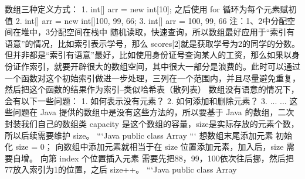 \markdownRendererInterblockSeparator
{}\markdownRendererInterblockSeparator
{}数组三种定义方式： 1. int[] arr = new int[10]; 之后使用 for 循环为每个元素赋初值 2. int[] arr = new int[]\markdownRendererLeftBrace{}100, 99, 66\markdownRendererRightBrace{}; 3. int[] arr = \markdownRendererLeftBrace{}100, 99, 66\markdownRendererRightBrace{} 注：1、2中分配空间在堆中，3分配空间在栈中\markdownRendererInterblockSeparator
{}\markdownRendererInterblockSeparator
{}随机读取，快速查询，所以数组最好应用于“索引有语意”的情况，比如索引表示学号，那么 scores[2]就是获取学号为2的同学的分数。\markdownRendererInterblockSeparator
{}但并非都是“索引有语意”最好，比如使用身份证号查询某人的工资，那么如果以身份证作索引，就要开辟很大的数组空间，其中很大一部分是浪费的。此时可以通过一个函数对这个初始索引做进一步处理，三列在一个范围内，并且尽量避免重复，然后把这个函数的结果作为索引--类似哈希表（散列表）\markdownRendererInterblockSeparator
{}数组没有语意的情况下，会有以下一些问题： 1. 如何表示没有元素？ 2. 如何添加和删除元素？ 3. ... ... 这些问题在 Java 提供的数组中是没有这些方法的，所以要基于 Java 的数组，二次封装我们自己的数组类 \markdownRendererInterblockSeparator
{}capacity 是这个数组的容量，size是实际存放的元素个数，所以后续需要维护 size。\markdownRendererInterblockSeparator
{}```Java public class Array\markdownRendererLeftBrace{}\markdownRendererInterblockSeparator
{}\markdownRendererInterblockSeparator
{}\markdownRendererRightBrace{} ```\markdownRendererInterblockSeparator
{}\markdownRendererInterblockSeparator
{}\markdownRendererOlBeginTight
{}想数组末尾添加元素 初始化 size = 0； 向数组中添加元素就相当于在 size 位置添加元素，加入后，size 需要自增。\markdownRendererOlItemEnd 
{}向第 index 个位置插入元素  需要先把88，99，100依次往后挪，然后把77放入索引为1的位置，之后 size++。\markdownRendererOlItemEnd 
\markdownRendererOlEndTight \markdownRendererInterblockSeparator
{}```Java public class Array\markdownRendererLeftBrace{}\markdownRendererInterblockSeparator
